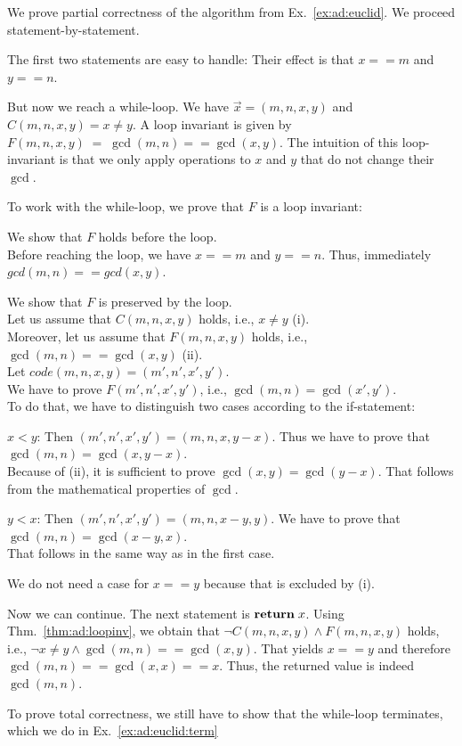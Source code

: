 \begin{example}\label{ex:ad:euclid:partcorr}
We prove partial correctness of the algorithm from Ex.~\ref{ex:ad:euclid}.
We proceed statement-by-statement.
\medskip

The first two statements are easy to handle: Their effect is that $x==m$ and $y==n$.
\medskip

But now we reach a while-loop.
We have $\vec{x}=(m,n,x,y)$ and $C(m,n,x,y)=x\neq y$.
A loop invariant is given by $F(m,n,x,y)\;=\;\gcd(m,n)==\gcd(x,y)$.
The intuition of this loop-invariant is that we only apply operations to $x$ and $y$ that do not change their $\gcd$.
\medskip

To work with the while-loop, we prove that $F$ is a loop invariant:
\begin{compactitem}
 \item We show that $F$ holds before the loop. \\ Before reaching the loop, we have $x==m$ and $y==n$. Thus, immediately $gcd(m,n)==gcd(x,y)$.
 \item We show that $F$ is preserved by the loop. \\ Let us assume that $C(m,n,x,y)$ holds, i.e., $x\neq y$ (i).\\
  Moreover, let us assume that $F(m,n,x,y)$ holds, i.e., $\gcd(m,n)==\gcd(x,y)$ (ii).\\
  Let $code(m,n,x,y)=(m',n',x',y')$.\\
  We have to prove $F(m',n',x',y')$, i.e., $\gcd(m,n)=\gcd(x',y')$.\\
  To do that, we have to distinguish two cases according to the if-statement:
  \begin{compactitem}
   \item $x<y$: Then $(m',n',x',y') = (m,n,x,y-x)$.
   Thus we have to prove that $\gcd(m,n)=\gcd(x,y-x)$.\\
   Because of (ii), it is sufficient to prove $\gcd(x,y)=\gcd(y-x)$.
   That follows from the mathematical properties of $\gcd$.
   \item $y<x$: Then $(m',n',x',y') = (m,n,x-y,y)$.
   We have to prove that $\gcd(m,n)=\gcd(x-y,x)$.\\
   That follows in the same way as in the first case.
   \item We do not need a case for $x==y$ because that is excluded by (i).
  \end{compactitem}
\end{compactitem}
\medskip

Now we can continue.
The next statement is $\areturn{x}$.
Using Thm.~\ref{thm:ad:loopinv}, we obtain that $\neg C(m,n,x,y)\wedge F(m,n,x,y)$ holds, i.e., $\neg x\neq y \wedge \gcd(m,n)==\gcd(x,y)$.
That yields $x==y$ and therefore $\gcd(m,n)==\gcd(x,x)==x$.
Thus, the returned value is indeed $\gcd(m,n)$.

To prove total correctness, we still have to show that the while-loop terminates, which we do in Ex.~\ref{ex:ad:euclid:term}
\end{example}

